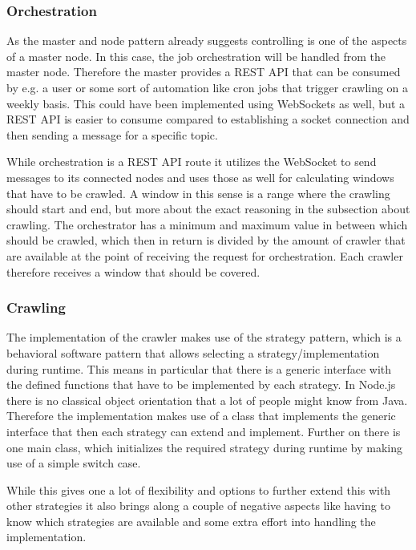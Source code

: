 \subsubsection{Orchestration}
As the master and node pattern already suggests controlling is one of the aspects of a master node. In this case, the job orchestration will be handled from the master node. Therefore the master provides a REST API that can be consumed by e.g. a user or some sort of automation like cron jobs that trigger crawling on a weekly basis. This could have been implemented using WebSockets as well, but a REST API is easier to consume compared to establishing a socket connection and then sending a message for a specific topic.

While orchestration is a REST API route it utilizes the WebSocket to send messages to its connected nodes and uses those as well for calculating windows that have to be crawled. A window in this sense is a range where the crawling should start and end, but more about the exact reasoning in the subsection about crawling. The orchestrator has a minimum and maximum value in between which should be crawled, which then in return is divided by the amount of crawler that are available at the point of receiving the request for orchestration. Each crawler therefore receives a window that should be covered.

\subsubsection{Crawling}
The implementation of the crawler makes use of the strategy pattern, which is a behavioral software pattern that allows selecting a strategy/implementation during runtime. This means in particular that there is a generic interface with the defined functions that have to be implemented by each strategy. In Node.js there is no classical object orientation that a lot of people might know from Java. Therefore the implementation makes use of a class that implements the generic interface that then each strategy can extend and implement. Further on there is one main class, which initializes the required strategy during runtime by making use of a simple switch case.

While this gives one a lot of flexibility and options to further extend this with other strategies it also brings along a couple of negative aspects like having to know which strategies are available and some extra effort into handling the implementation.

